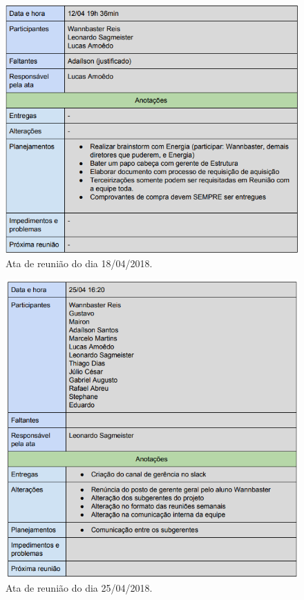 \begin{apendicesenv}
\begin{figure}[H]
	\centering
	\includegraphics[width=15cm]{figuras/apendice_e.png}
	\caption{Ata de reunião do dia 18/04/2018.
	} \label{apendice_f}
\end{figure}

\begin{figure}[H]
	\centering
	\includegraphics[width=15cm]{figuras/apendice_g.png}
	\caption{Ata de reunião do dia 25/04/2018.
	} \label{apendice_g}
\end{figure}


\end{apendicesenv}
